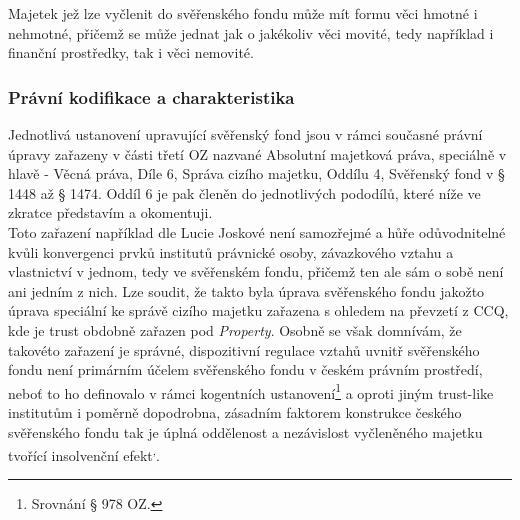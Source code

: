 \documentclass{article}
\begin{document}
Majetek jež lze vyčlenit do svěřenského fondu může mít formu věci hmotné i nehmotné, přičemž se může jednat jak o jakékoliv věci movité, tedy například i finanční prostředky, tak i věci nemovité.\\ 






\subsubsection{Právní kodifikace a charakteristika}

Jednotlivá ustanovení upravující svěřenský fond jsou v rámci současné právní úpravy zařazeny v části třetí OZ nazvané Absolutní majetková práva, speciálně v hlavě  \MakeUppercase{{}} - Věcná práva, Díle 6, Správa cizího majetku, Oddílu 4, Svěřenský fond v § 1448 až § 1474. Oddíl 6 je pak členěn do jednotlivých pododílů, které níže ve zkratce představím a okomentuji. \\

Toto zařazení například dle Lucie Joskové není samozřejmé a hůře odůvodnitelné kvůli konvergenci prvků institutů právnické osoby, závazkového vztahu a vlastnictví v jednom, tedy ve svěřenském fondu, přičemž ten ale sám o sobě není ani jedním z nich. Lze soudit, že takto byla úprava svěřenského fondu jakožto úprava speciální ke správě cizího majetku zařazena s ohledem na převzetí z CCQ, kde je trust obdobně zařazen pod \textit{Property}. Osobně se však domnívám, že takovéto zařazení je správné, dispozitivní regulace vztahů uvnitř svěřenského fondu není primárním účelem svěřenského fondu v českém právním prostředí, neboť to ho definovalo v rámci kogentních ustanovení\footnote{Srovnání § 978 OZ.} a oproti jiným trust-like institutům i poměrně dopodrobna, zásadním faktorem konstrukce českého svěřenského fondu tak je úplná oddělenost a nezávislost vyčleněného majetku tvořící insolvenční efekt\textsuperscript{,}.\\
\end{document}
